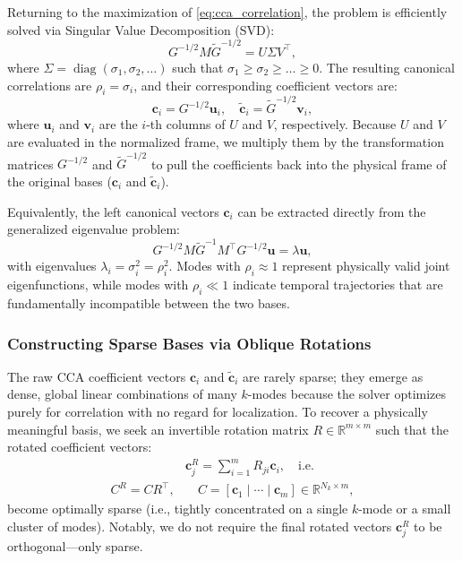 \begin{subappendices}
Returning to the maximization of \cref{eq:cca_correlation}, the problem is efficiently solved via Singular Value Decomposition (SVD):
\begin{equation}
G^{-1/2} M \tilde G^{-1/2} = U \Sigma V^\top,
\end{equation}
where $\Sigma = \operatorname{diag}(\sigma_1, \sigma_2, \dots)$ such that $\sigma_1 \ge \sigma_2 \ge \dots \ge 0$. The resulting canonical correlations are $\rho_i = \sigma_i$, and their corresponding coefficient vectors are:
\begin{equation}
\boldsymbol{c}_i = G^{-1/2} \boldsymbol{u}_i,\quad \boldsymbol{\tilde c}_i = \tilde G^{-1/2} \boldsymbol{v}_i,
\end{equation}
where $\boldsymbol{u}_i$ and $\boldsymbol{v}_i$ are the $i$-th columns of $U$ and $V$, respectively. Because $U$ and $V$ are evaluated in the normalized frame, we multiply them by the transformation matrices $G^{-1/2}$ and $\tilde G^{-1/2}$ to pull the coefficients back into the physical frame of the original bases ($\boldsymbol{c}_i$ and $\boldsymbol{\tilde c}_i$).

Equivalently, the left canonical vectors $\boldsymbol{c}_i$ can be extracted directly from the generalized eigenvalue problem:
\begin{equation}
G^{-1/2} M \tilde G^{-1} M^\top G^{-1/2} \boldsymbol{u} = \lambda \boldsymbol{u},
\end{equation}
with eigenvalues $\lambda_i = \sigma_i^2 = \rho_i^2$. Modes with $\rho_i \approx 1$ represent physically valid joint eigenfunctions, while modes with $\rho_i \ll 1$ indicate temporal trajectories that are fundamentally incompatible between the two bases.

\subsubsection{Constructing Sparse Bases via Oblique Rotations}

The raw CCA coefficient vectors $\boldsymbol{c}_i$ and $\boldsymbol{\tilde c}_i$ are rarely sparse; they emerge as dense, global linear combinations of many $k$-modes because the solver optimizes purely for correlation with no regard for localization. To recover a physically meaningful basis, we seek an invertible rotation matrix $R \in \mathbb{R}^{m \times m}$ such that the rotated coefficient vectors:
\begin{equation}
\begin{aligned}
    &{\boldsymbol{c}}^R_j = \sum_{i=1}^m R_{ji} \boldsymbol{c}_i, \quad \text{i.e.} \\ {C}^R = C R^\top, &\quad C = [\boldsymbol{c}_1 \mid \cdots \mid \boldsymbol{c}_m] \in \mathbb{R}^{N_k \times m},
\end{aligned}
\end{equation}
become optimally sparse (i.e., tightly concentrated on a single $k$-mode or a small cluster of modes). Notably, we do not require the final rotated vectors ${\boldsymbol{c}}^R_j$ to be orthogonal—only sparse.


\end{subappendices}
